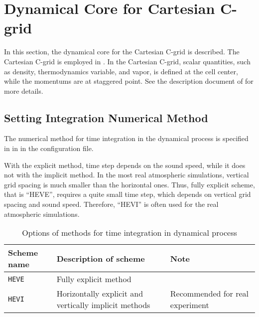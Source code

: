 \section{Dynamical Core for Cartesian C-grid} \label{sec:atmos_dyn_cartesC}
In this section, the dynamical core for the Cartesian C-grid is described.
The Cartesian C-grid is employed in \scalerm.
In the Cartesian C-grid, scalar quantities, such as density, thermodynamics variable, and vapor, is defined at the cell center, while the momentums are at staggered point.
See the description document of \scalerm for more details.



\subsection{Setting Integration Numerical Method}  %
The numerical method for time integration in the dynamical process is specified in  in  in the configuration file.

With the explicit method, time step depends on the sound speed, while it does not with the implicit method.
In the most real atmospheric simulations, vertical grid spacing is much smaller than the horizontal ones.
Thus, fully explicit scheme, that is ``HEVE'', requires a quite small time step, which depends on vertical grid spacing and sound speed.
Therefore, ``HEVI'' is often used for the real atmospheric simulations.



\begin{table}[bth]
\begin{center}
  \caption{Options of methods for time integration in dynamical process}
  \label{tab:nml_dyn}
  \begin{tabularx}{150mm}{llX} \hline
    \rowcolor[gray]{0.9}  Scheme name & Description of scheme & Note\\ \hline
      \verb|HEVE|  & Fully explicit method & \\
      \verb|HEVI|  & Horizontally explicit and vertically implicit methods & Recommended for real experiment\\
    \hline
  \end{tabularx}
\end{center}
\end{table}


